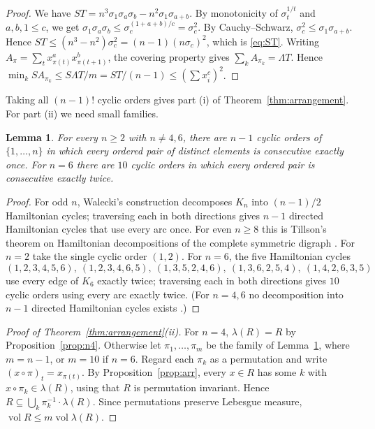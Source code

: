 \documentclass[11pt]{article}
\newtheorem{lemma}[theorem]{Lemma}
\theoremstyle{remark}
\numberwithin{equation}{section}
\begin{document}
\begin{proof}
We have $ST=n^3\sigma_1\sigma_a\sigma_b-n^2\sigma_1\sigma_{a+b}$. By monotonicity of
$\sigma_t^{1/t}$ and $a,b,1\le c$, we get $\sigma_1\sigma_a\sigma_b\le\sigma_c^{(1+a+b)/c}=\sigma_c^2$.
By Cauchy--Schwarz, $\sigma_c^2\le\sigma_1\sigma_{a+b}$. Hence
$ST\le(n^3-n^2)\sigma_c^2=(n-1)(n\sigma_c)^2$, which is \eqref{eq:ST}. Writing $A_\pi=\sum_tx_{\pi(t)}^ax_{\pi(t+1)}^b$, the covering property gives
$\sum_kA_{\pi_k}=\Lambda T$. Hence $\min_kSA_{\pi_k}\le S\Lambda T/m=ST/(n-1)\le(\sum x_i^c)^2$.
\end{proof}

Taking all $(n-1)!$ cyclic orders gives part (i) of Theorem~\ref{thm:arrangement}. For part (ii) we need small families.

\begin{lemma}\label{lem:hamilton}
For every $n\ge2$ with $n\ne4,6$, there are $n-1$ cyclic orders of $\{1,\dots,n\}$ in which every
ordered pair of distinct elements is consecutive exactly once. For $n=6$ there are $10$ cyclic
orders in which every ordered pair is consecutive exactly twice.
\end{lemma}

\begin{proof}
For odd $n$, Walecki's construction \cite{Luc} decomposes $K_n$ into $(n-1)/2$ Hamiltonian
cycles; traversing each in both directions gives $n-1$ directed Hamiltonian cycles that use
every arc once. For even $n\ge8$ this is Tillson's theorem on Hamiltonian decompositions of the
complete symmetric digraph \cite{Til}. For $n=2$ take the single cyclic order $(1,2)$. For
$n=6$, the five Hamiltonian cycles
\[
(1,2,3,4,5,6),\ (1,2,3,4,6,5),\ (1,3,5,2,4,6),\ (1,3,6,2,5,4),\ (1,4,2,6,3,5)
\]
use every edge of $K_6$ exactly twice; traversing each in both directions gives $10$ cyclic
orders using every arc exactly twice. (For $n=4,6$ no decomposition into $n-1$ directed
Hamiltonian cycles exists \cite{Til}.)
\end{proof}

\begin{proof}[Proof of Theorem~\ref{thm:arrangement}(ii)]
For $n=4$, $\lambda(R)=R$ by Proposition~\ref{prop:n4}. Otherwise let $\pi_1,\dots,\pi_m$ be
the family of Lemma~\ref{lem:hamilton}, where $m=n-1$, or $m=10$ if $n=6$. Regard each $\pi_k$
as a permutation and write $(x\circ\pi)_t=x_{\pi(t)}$. By Proposition~\ref{prop:arr}, every
$x\in R$ has some $k$ with $x\circ\pi_k\in\lambda(R)$, using that $R$ is permutation invariant.
Hence $R\subseteq\bigcup_k\pi_k^{-1}\cdot\lambda(R)$. Since permutations preserve Lebesgue
measure, $\operatorname{vol}R\le m\operatorname{vol}\lambda(R)$.
\end{proof}
\end{document}
